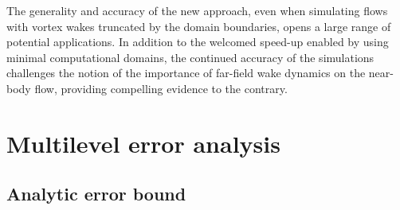 \documentclass[11pt]{article}
\begin{document}
The generality and accuracy of the new approach, even when simulating flows with vortex wakes truncated by the domain boundaries, opens a large range of potential applications. In addition to the welcomed speed-up enabled by using minimal computational domains, the continued accuracy of the simulations challenges the notion of the importance of far-field wake dynamics on the near-body flow, providing compelling evidence to the contrary.



\appendix

\section{Multilevel error analysis}\label{A0}

\subsection{Analytic error bound}
\end{document}
